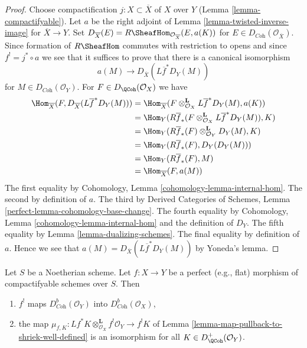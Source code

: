 \begin{proof}
Choose compactification $j : X \subset \overline{X}$ of $X$ over $Y$
(Lemma \ref{lemma-compactifyable}). Let $a$ be the
right adjoint of Lemma \ref{lemma-twisted-inverse-image} for
$\overline{X} \to Y$. Set
$D_{\overline{X}}(E) = R\SheafHom_{\mathcal{O}_{\overline{X}}}(E, a(K))$
for $E \in D_{\textit{Coh}}(\mathcal{O}_{\overline{X}})$.
Since formation of $R\SheafHom$ commutes with restriction to opens
and since $f^! = j^* \circ a$ we see that it suffices to prove that
there is a canonical isomorphism
$$
a(M) \longrightarrow D_{\overline{X}}(L\overline{f}^*D_Y(M))
$$
for $M \in D_{\textit{Coh}}(\mathcal{O}_Y)$. For
$F \in D_\QCoh(\mathcal{O}_X)$ we have
\begin{align*}
\Hom_{\overline{X}}(
F, D_{\overline{X}}(L\overline{f}^*D_Y(M)))
& =
\Hom_{\overline{X}}(
F \otimes_{\mathcal{O}_X}^\mathbf{L} L\overline{f}^*D_Y(M), a(K)) \\
& =
\Hom_Y(
R\overline{f}_*(F \otimes_{\mathcal{O}_X}^\mathbf{L} L\overline{f}^*D_Y(M)),
K) \\
& =
\Hom_Y(
R\overline{f}_*(F) \otimes_{\mathcal{O}_Y}^\mathbf{L} D_Y(M),
K) \\
& =
\Hom_Y(
R\overline{f}_*(F), D_Y(D_Y(M))) \\
& =
\Hom_Y(R\overline{f}_*(F), M) \\
& = \Hom_{\overline{X}}(F, a(M))
\end{align*}
The first equality by Cohomology, Lemma \ref{cohomology-lemma-internal-hom}.
The second by definition of $a$.
The third by Derived Categories of Schemes, Lemma
\ref{perfect-lemma-cohomology-base-change}.
The fourth equality by Cohomology, Lemma \ref{cohomology-lemma-internal-hom}
and the definition of $D_Y$.
The fifth equality by Lemma \ref{lemma-dualizing-schemes}.
The final equality by definition of $a$.
Hence we see that $a(M) = D_{\overline{X}}(L\overline{f}^*D_Y(M))$
by Yoneda's lemma.
\end{proof}

\begin{lemma}
\label{lemma-perfect-comparison-shriek}
Let $S$ be a Noetherian scheme. Let $f : X \to Y$ be a perfect
(e.g., flat) morphism of compactifyable schemes over $S$. Then
\begin{enumerate}
\item $f^!$ maps $D_{\textit{Coh}}^b(\mathcal{O}_Y)$ into
$D_{\textit{Coh}}^b(\mathcal{O}_X)$,
\item the map
$\mu_{f,  K} :
Lf^*K \otimes_{\mathcal{O}_X}^\mathbf{L} f^!\mathcal{O}_Y
\to
f^!K$
of Lemma \ref{lemma-map-pullback-to-shriek-well-defined}
is an isomorphism for all $K \in D_\QCoh^+(\mathcal{O}_Y)$.
\end{enumerate}
\end{lemma}

